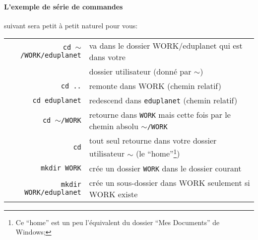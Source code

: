 \documentclass[a4paper,10pt]{article}
\begin{document}
\paragraph{L'exemple de série de commandes} suivant sera petit à petit naturel
pour vous:
\begin{savenotes}
\begin{table}[h!]
\centering
\begin{tabular}{rl}
\texttt{cd $\sim$/WORK/eduplanet} & va dans le dossier WORK/eduplanet qui
est dans votre \\
& dossier utilisateur (donné par $\sim$) \\
\texttt{cd ..} & remonte dans WORK (chemin relatif) \\
\texttt{cd eduplanet} & redescend dans \texttt{eduplanet} (chemin relatif)
\\
\texttt{cd $\sim$/WORK} & retourne dans \texttt{WORK} mais cette fois par
le chemin absolu \texttt{$\sim$/WORK} \\
\texttt{cd} & tout seul retourne dans votre dossier utilisateur $\sim$ (le
``home''\footnote{Ce ``home'' est un peu l'équivalent du dossier ``Mes
Documents'' de Windows;}) \\
\texttt{mkdir WORK} & crée un dossier \texttt{WORK} dans le dossier
courant \\
\texttt{mkdir WORK/eduplanet} & crée un sous-dossier dans WORK seulement
si WORK existe \\
\end{tabular}
\end{table}
\end{savenotes}

\end{document}
